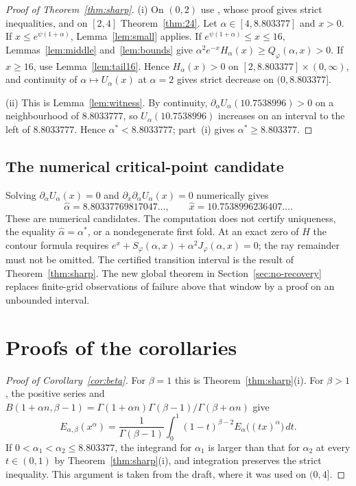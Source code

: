 \documentclass[11pt,a4paper]{article}
\theoremstyle{plain}
\theoremstyle{remark}
\begin{document}
\begin{proof}[Proof of Theorem~\ref{thm:sharp}]
(i) On $(0,2)$ use \cite[Theorem~A]{FS}, whose proof gives strict inequalities, and on $[2,4]$
Theorem~\ref{thm:24}. Let
$\alpha\in[4,8.803377]$ and $x>0$. If $x\le e^{\psi(1+\alpha)}$, Lemma~\ref{lem:small} applies. If
$e^{\psi(1+\alpha)}\le x\le16$, Lemmas~\ref{lem:middle} and~\ref{lem:bounds} give
$\alpha^2e^{-x}H_\alpha(x)\ge Q_\varphi(\alpha,x)>0$. If $x\ge16$, use Lemma~\ref{lem:tail16}.
Hence $H_\alpha(x)>0$ on $[2,8.803377]\times(0,\infty)$, and continuity of $\alpha\mapsto U_\alpha(x)$
at $\alpha=2$ gives strict decrease on $(0,8.803377]$.

(ii) This is Lemma~\ref{lem:witness}. By continuity, $\partial_\alpha U_\alpha(10.7538996)>0$ on a
neighbourhood of $8.8033777$, so $U_\alpha(10.7538996)$ increases on an interval to the left of
$8.8033777$. Hence $\alpha^*<8.8033777$; part~(i) gives $\alpha^*\ge8.803377$.
\end{proof}

\subsection{The numerical critical-point candidate}\label{subsec:critical}
Solving $\partial_\alpha U_\alpha(x)=0$ and
$\partial_x\partial_\alpha U_\alpha(x)=0$ numerically gives
\[
 \widehat\alpha=8.80337769817047\ldots,\qquad
 \widehat x=10.7538996236407\ldots.
\]
These are numerical candidates. The computation does not certify uniqueness,
the equality $\widehat\alpha=\alpha^*$, or a nondegenerate first fold.
At an exact zero of $H$ the contour formula requires
$e^x+S_\varphi(\alpha,x)+\alpha^2J_\varphi(\alpha,x)=0$;
the ray remainder must not be omitted. The certified transition interval is
the result of Theorem~\ref{thm:sharp}. The new global theorem in
Section~\ref{sec:no-recovery} replaces finite-grid observations of failure
above that window by a proof on an unbounded interval.

\section{Proofs of the corollaries}\label{sec:cor}
\begin{proof}[Proof of Corollary~\ref{cor:beta}]
For $\beta=1$ this is Theorem~\ref{thm:sharp}(i). For $\beta>1$, the positive series and
$B(1+\alpha n,\beta-1)=\Gamma(1+\alpha n)\Gamma(\beta-1)/\Gamma(\beta+\alpha n)$ give
\[
 E_{\alpha,\beta}(x^\alpha)=\frac{1}{\Gamma(\beta-1)}\int_0^1(1-t)^{\beta-2}E_\alpha\bigl((tx)^\alpha\bigr)\,dt .
\]
If $0<\alpha_1<\alpha_2\le8.803377$, the integrand for $\alpha_1$ is larger than that for $\alpha_2$
at every $t\in(0,1)$ by Theorem~\ref{thm:sharp}(i), and integration preserves the strict
inequality. This argument is taken from the draft, where it was used on $(0,4]$.
\end{proof}
\end{document}
